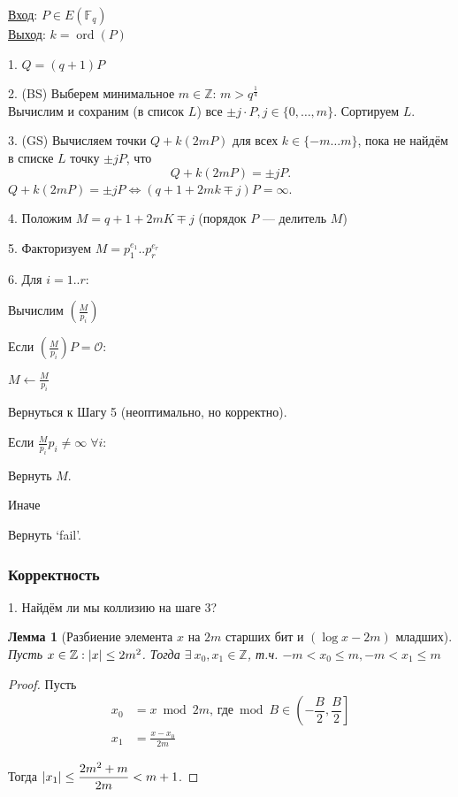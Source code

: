 \documentclass[12pt]{article}
\newcommand{\Z}{{{\mathbb Z}}}
\newcommand{\F}{{{\mathbb F}}}
\newcommand{\bigO}{\mathcal{O}}
\DeclarePairedDelimiter{\abs}{\lvert}{\rvert}
\newtheorem{lemma}[theorem]{Лемма}
\theoremstyle{definition}
\theoremstyle{definition}
\theoremstyle{definition}
\begin{document}
\underline{Вход}: $P\in E(\F_q)$\\
\underline{Выход}: $k = \operatorname{ord}(P)$

1. $Q = (q+1)P$

2. (BS) Выберем минимальное $m \in \Z$: $m > q^\frac{1}{4}$\\
Вычислим и сохраним (в список $L$) все $\pm j \cdot P, j \in \{ 0, \ldots,  m\}$. Сортируем $L$.

3. (GS) Вычисляем точки $Q + k(2mP)$ для всех $k \in  \{-m \ldots m\}$, пока не найдём в списке $L$ точку $\pm  jP$, что 
\[
    Q + k(2mP) = \pm  jP.
\]
$Q + k(2mP) = \pm jP \iff (q+1 + 2mk \mp  j)P = \infty$.

4. Положим $M = q+1+2mK \mp  j$ (порядок $P$ — делитель $M$)

5. Факторизуем $M = p_1^{e_1}..p_r^{e_r}$

6. Для $i = 1..r$:

Вычислим $\left(\frac{M}{p_i} \right)$

Если $\left(\frac{M}{p_i} \right)P=\bigO$:

\quad $M \leftarrow \frac{M}{p_i}$

\quad Вернуться к Шагу 5 (неоптимально, но корректно). 

Если $\frac{M}{p_i}p_i \neq \infty \; \forall i$:

\quad Вернуть $M$.
 
Иначе

\quad Вернуть `fail'.

\subsubsection{Корректность}

1. Найдём ли мы коллизию на шаге 3?
\begin{lemma}[Разбиение элемента $x$ на $2m$ старших бит и $(\log x - 2m)$ младших]
    Пусть $x \in \Z: \abs{x} \leq 2m^2$. Тогда $\exists \ x_0, x_1 \in \Z$, т.ч. $-m < x_0 \leq m, -m < x_1 \leq m$
\end{lemma}
\begin{proof}
    Пусть
    \begin{align*}
        x_0 &= x \bmod 2m \text{, где} \bmod B \in \left(-\dfrac{B}{2}, \dfrac{B}{2} \right] \\
        x_1 &= \frac{x-x_0}{2m}
    \end{align*}
    
    Тогда $\abs{x_1} \leq \dfrac{2m^2 + m}{2m} < m+1$.
\end{proof}
\end{document}
